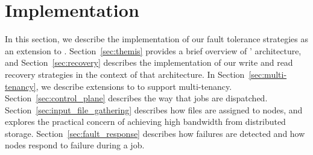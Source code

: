 \section{Implementation}

In this section, we describe the implementation of our fault tolerance
strategies as an extension to \themis. Section~\ref{sec:themis} provides a
brief overview of \themis' architecture, and Section~\ref{sec:recovery}
describes the implementation of our write and read recovery strategies in the
context of that architecture. In Section~\ref{sec:multi-tenancy}, we describe
extensions to \themis to support multi-tenancy. Section~\ref{sec:control_plane}
describes the way that jobs are dispatched.
Section~\ref{sec:input_file_gathering} describes how files are assigned to
nodes, and explores the practical concern of achieving high bandwidth from
distributed storage. Section~\ref{sec:fault_response} describes how failures
are detected and how nodes respond to failure during a job.












